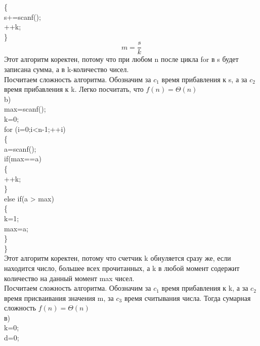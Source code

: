 \documentclass[a4paper,12pt]{article}
\begin{document}
\{\\
 \hspace*{20pt}  s+=scanf();\\
 \hspace*{20pt} ++k;\\
\}\\
\[m=\frac{s}{k}\]
Этот алгоритм коректен, потому что при любом n после цикла for в  s будет записана сумма, а в k-количество чисел.\\
Посчитаем сложность алгоритма. Обозначим за $c_1$ время прибавления к s, а за $c_2$ время прибавления к k.
Легко посчитать, что $f(n)=\Theta(n)$\\
b)\\
max=scanf();\\
k=0;\\
for (i=0;i<n-1;++i)\\
\{\\
\hspace*{20pt} a=scanf();\\
\hspace*{20pt} if(max==a)\\
\hspace*{20pt} \{\\
\hspace*{40pt} ++k;\\
\hspace*{20pt} \}\\
 \hspace*{20pt} else if(a > max)\\
 \hspace*{20pt} \{\\
 \hspace*{40pt} k=1;\\
 \hspace*{40pt} max=a;\\
 \hspace*{20pt} \}\\
\}\\
Этот алгоритм коректен, потому что счетчик k обнуляется сразу же, если находится число, большее всех прочитанных, а k в любой момент содержит количество на данный момент max чисел.\\
Посчитаем сложность алгоритма. Обозначим за $c_1$ время прибавления к k, а за $c_2$ время присваивания значения m, за $c_3$ время считывания числа.
Тогда сумарная сложность $f(n)=\Theta(n)$\\
в)\\
k=0;\\
d=0;\\
\end{document}
